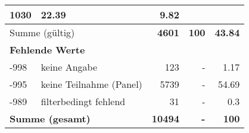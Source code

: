 \begin{longtable}{lXrrr}
       \num{1030} &
       \num[round-mode=places,round-precision=2]{22,39} &
         \num[round-mode=places,round-precision=2]{9,82} \\
     \midrule
     \multicolumn{2}{l}{Summe (gültig)} &
       \textbf{\num{4601}} &
     \textbf{100} &
       \textbf{\num[round-mode=places,round-precision=2]{43,84}} \\
     \multicolumn{5}{l}{\textbf{Fehlende Werte}}\\
       -998 &
       keine Angabe &
         \num{123} &
        - &
         \num[round-mode=places,round-precision=2]{1,17} \\
       -995 &
       keine Teilnahme (Panel) &
         \num{5739} &
        - &
         \num[round-mode=places,round-precision=2]{54,69} \\
       -989 &
       filterbedingt fehlend &
         \num{31} &
        - &
         \num[round-mode=places,round-precision=2]{0,3} \\
     \midrule
     \multicolumn{2}{l}{\textbf{Summe (gesamt)}} &
          \textbf{\num{10494}} &
        \textbf{-} &
        \textbf{100} \\
     \bottomrule
     \end{longtable}
     

